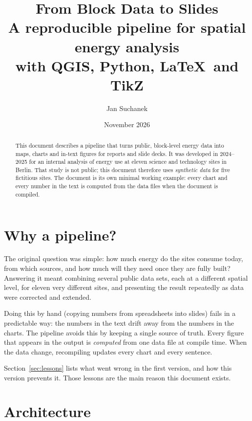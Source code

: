 \documentclass[11pt,a4paper]{article}
\title{From Block Data to Slides\\[4pt]
  \large A reproducible pipeline for spatial energy analysis\\
  with QGIS, Python, \LaTeX\ and TikZ}
\author{Jan Suchanek}
\date{November 2026}
\begin{document}
\maketitle

\begin{abstract}\noindent
This document describes a pipeline that turns public, block-level energy data
into maps, charts and in-text figures for reports and slide decks. It was
developed in 2024--2025 for an internal analysis of energy use at eleven
science and technology sites in Berlin. That study is not public; this
document therefore uses \emph{synthetic data} for five fictitious sites.
The document is its own minimal working example: every chart and every number
in the text is computed from the data files when the document is compiled.
\end{abstract}

\tableofcontents

\section{Why a pipeline?}

The original question was simple: how much energy do the sites consume today,
from which sources, and how much will they need once they are fully built?
Answering it meant combining several public data sets, each at a different
spatial level, for eleven very different sites, and presenting the result
repeatedly as data were corrected and extended.

Doing this by hand (copying numbers from spreadsheets into slides) fails in a
predictable way: the numbers in the text drift away from the numbers in the
charts. The pipeline avoids this by keeping a single source of truth.
Every figure that appears in the output is \emph{computed} from one data file
at compile time. When the data change, recompiling updates every chart and
every sentence.

Section~\ref{sec:lessons} lists what went wrong in the first version, and how
this version prevents it. Those lessons are the main reason this document
exists.

\section{Architecture}\label{sec:architecture}
\end{document}
